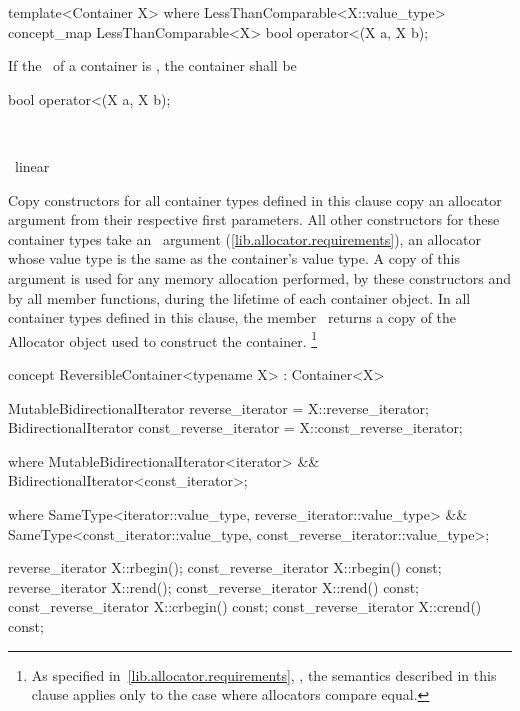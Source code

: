 \documentclass[american,twoside]{book}
\begin{document}
\begin{itemdecl}
template<Container X>
where LessThanComparable<X::value_type>
concept_map LessThanComparable<X> 
{ 
  bool operator<(X a, X b);
}
\end{itemdecl}

\begin{itemdescr}
\pnum
If the \ of a container is
, the container shall be
\end{itemdescr}

\begin{itemdecl}
bool operator<(X a, X b);
\end{itemdecl}

\begin{itemdescr}
\pnum
\returns\

\pnum
\complexity\
linear
\end{itemdescr}

\color{black}

\pnum
Copy constructors for all container types defined in this clause
copy an allocator argument from their respective first parameters.
All other constructors for these container types take an
\tcode{Allocator\&}\
argument (\ref{lib.allocator.requirements}),
an allocator whose value type is the same as the container's value type.
A copy of this argument is used for any memory allocation
performed, by these constructors and by all member functions, during
the lifetime of each container object.
In all container types defined
in this clause, the member \tcode{get_allocator()}\ returns a copy
of the Allocator object used to construct the container.%
\footnote{As specified in~\ref{lib.allocator.requirements}, ,
the semantics described in this clause applies only to the case where
allocators compare equal.
}

\pnum
{}

\color{addclr}
\begin{itemdecl}
concept ReversibleContainer<typename X> : Container<X> {
  MutableBidirectionalIterator reverse_iterator       = X::reverse_iterator;
  BidirectionalIterator const_reverse_iterator = X::const_reverse_iterator;

  where MutableBidirectionalIterator<iterator> &&
        BidirectionalIterator<const_iterator>;

  where SameType<iterator::value_type, reverse_iterator::value_type> &&
        SameType<const_iterator::value_type, const_reverse_iterator::value_type>;

  reverse_iterator       X::rbegin();
  const_reverse_iterator X::rbegin() const;
  reverse_iterator       X::rend();
  const_reverse_iterator X::rend() const;
  const_reverse_iterator X::crbegin() const;
  const_reverse_iterator X::crend() const;
}
\end{itemdecl}
\color{black}
\end{document}
